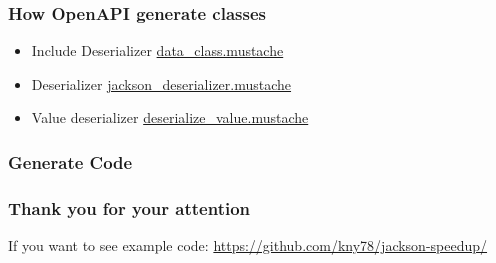 \documentclass{beamer}
\begin{document}
    \begin{frame}
        \frametitle{How OpenAPI generate classes}
        \begin{itemize}

            \item Include Deserializer
            \href{file:///home/kny/src/personal/jackson-speedup/openapi-templates/data_class.mustache}{data\_class.mustache}

            \item Deserializer
            \href{file:/home/kny/src/personal/jackson-speedup/openapi-templates/jackson_deserializer.mustache}{jackson\_deserializer.mustache}

            \item Value deserializer
            \href{file:///home/kny/src/personal/jackson-speedup/openapi-templates/jackson_deserializer.mustache}{deserialize\_value.mustache}
        \end{itemize}

    \end{frame}




    \begin{frame}
        \frametitle{Generate Code}

        \runOpenAPIGenerator

    \end{frame}



    \begin{frame}
        \frametitle{Thank you for your attention}
        If you want to see example code: \url{https://github.com/kny78/jackson-speedup/}

    \end{frame}
\end{document}
